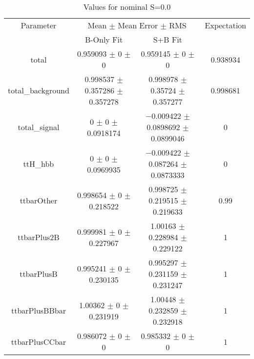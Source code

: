 \begin{table}
\centering
\caption{Values for nominal S=0.0}
\begin{tabular}{cccc}
\toprule
Parameter & \multicolumn{2}{c}{Mean $\pm$ Mean Error $\pm$ RMS} & Expectation\\
 & B-Only Fit & S+B Fit & \\
\midrule
total & \num{0.959093} $\pm$ \num{0} $\pm$ \num{0} & \num{0.959145} $\pm$ \num{0} $\pm$ \num{0} & \num{0.938934}\\
total\_background & \num{0.998537} $\pm$ \num{0.357286} $\pm$ \num{0.357278} & \num{0.998978} $\pm$ \num{0.35724} $\pm$ \num{0.357277} & \num{0.998681}\\
total\_signal & \num{0} $\pm$ \num{0} $\pm$ \num{0.0918174} & \num{-0.009422} $\pm$ \num{0.0898692} $\pm$ \num{0.0899046} & \num{0}\\
ttH\_hbb & \num{0} $\pm$ \num{0} $\pm$ \num{0.0969935} & \num{-0.009422} $\pm$ \num{0.087264} $\pm$ \num{0.0873333} & \num{0}\\
ttbarOther & \num{0.998654} $\pm$ \num{0} $\pm$ \num{0.218522} & \num{0.998725} $\pm$ \num{0.219515} $\pm$ \num{0.219633} & \num{0.99}\\
ttbarPlus2B & \num{0.999981} $\pm$ \num{0} $\pm$ \num{0.227967} & \num{1.00163} $\pm$ \num{0.228984} $\pm$ \num{0.229122} & \num{1}\\
ttbarPlusB & \num{0.995241} $\pm$ \num{0} $\pm$ \num{0.230135} & \num{0.995297} $\pm$ \num{0.231159} $\pm$ \num{0.231247} & \num{1}\\
ttbarPlusBBbar & \num{1.00362} $\pm$ \num{0} $\pm$ \num{0.231919} & \num{1.00448} $\pm$ \num{0.232859} $\pm$ \num{0.232918} & \num{1}\\
ttbarPlusCCbar & \num{0.986072} $\pm$ \num{0} $\pm$ \num{0} & \num{0.985332} $\pm$ \num{0} $\pm$ \num{0} & \num{1}\\
\bottomrule
\end{tabular}
\end{table}